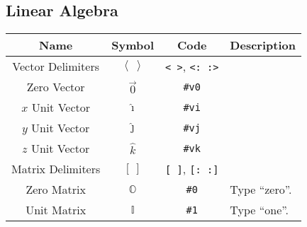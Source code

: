 \documentclass{article}
\begin{document}
  \subsection{Linear Algebra} %
  \label{sub:linearalgebra}
  \begin{table}[!h]
    \centering
    \begin{tabular}{|c|c|c|l|}
      \hline
      \textbf{Name} & \textbf{Symbol} & \textbf{Code} & \textbf{Description} \\
      \hline\hline
      Vector Delimiters & \( \left\langle \ \right\rangle \) & \texttt{< >}, \texttt{<: :>} & \\[2 pt]
      Zero Vector & \( \vec0 \) & \texttt{\#v0} & \\
      \( x \) Unit Vector & \( \hat\imath \) & \texttt{\#vi} & \\
      \( y \) Unit Vector & \( \hat\jmath \) & \texttt{\#vj} & \\
      \( z \) Unit Vector & \( \hat{k} \) & \texttt{\#vk} & \\
      \hline
      Matrix Delimiters & \( \left[ \ \right] \) & \texttt{[ ]}, \texttt{[: :]} & \\
      Zero Matrix & \( \mathbb{O} \) & \texttt{\#0} & Type ``zero''.\\
      Unit Matrix & \( \mathbb{I} \) & \texttt{\#1} & Type ``one''.\\
      \hline
    \end{tabular}
  \end{table}

\end{document}
